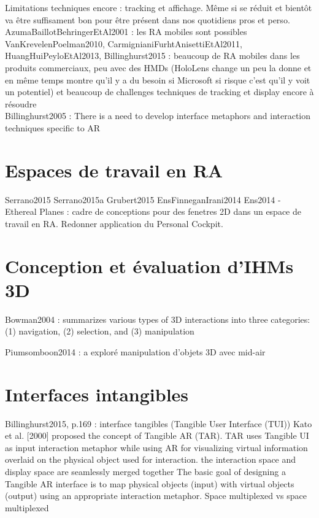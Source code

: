 Limitations techniques encore : tracking et affichage. Même si se réduit et bientôt va être suffisament bon pour être présent dans nos quotidiens pros et perso.\\
AzumaBaillotBehringerEtAl2001 : les RA mobiles sont possibles\\
VanKrevelenPoelman2010, CarmignianiFurhtAnisettiEtAl2011, HuangHuiPeyloEtAl2013, Billinghurst2015 : beaucoup de RA mobiles dans les produits commerciaux, peu avec des HMDs (HoloLens change un peu la donne et en même temps montre qu'il y a du besoin si Microsoft si risque c'est qu'il y voit un potentiel) et beaucoup de challenges techniques de tracking et display encore à résoudre\\
Billinghurst2005 : There is a need to develop interface metaphors and interaction techniques specific to AR


\section{Espaces de travail en RA}
Serrano2015
Serrano2015a
Grubert2015
EnsFinneganIrani2014
Ens2014 - Ethereal Planes : cadre de conceptions pour des fenetres 2D dans un espace de travail en RA. Redonner application du Personal Cockpit.


\section{Conception et évaluation d'IHMs 3D}
Bowman2004 : summarizes various types of 3D interactions into three categories: (1) navigation, (2) selection, and (3)
manipulation

Piumsomboon2014 : a exploré manipulation d'objets 3D avec mid-air


\section{Interfaces intangibles}
Billinghurst2015, p.169 : interface tangibles (Tangible User Interface (TUI))
Kato et al. [2000] proposed the concept of Tangible AR (TAR). TAR uses Tangible UI as input interaction metaphor while using AR for visualizing virtual information overlaid on the physical object used for interaction. the interaction space and display space are seamlessly merged together
The basic goal of designing a Tangible AR interface is to map physical objects (input) with virtual objects (output) using an appropriate interaction metaphor. 
Space multiplexed vs space multiplexed

